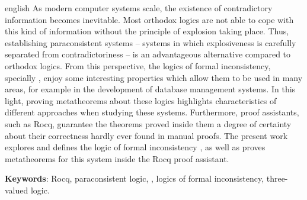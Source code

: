 \begin{resumo}[Abstract]
 \begin{otherlanguage*}{english}
    As modern computer systems scale, the existence of contradictory information becomes inevitable. Most orthodox logics are not able to cope with this kind of information without the principle of explosion taking place. Thus, establishing paraconsistent systems {--} systems in which explosiveness is carefully separated from contradictoriness {--} is an advantageous alternative compared to orthodox logics. From this perspective, the logics of formal inconsistency, specially \lfium{}, enjoy some interesting properties which allow them to be used in many areas, for example in the development of database management systems. In this light, proving metatheorems about these logics highlights characteristics of different approaches when studying these systems. Furthermore, proof assistants, such as Rocq, guarantee the theorems proved inside them a degree of certainty about their correctness hardly ever found in manual proofs. The present work explores and defines the logic of formal inconsistency \lfium{}, as well as proves metatheorems for this system inside the Rocq proof assistant.

   \textbf{Keywords}: Rocq, paraconsistent logic, \lfium{}, logics of formal inconsistency, three-valued logic.
 \end{otherlanguage*}
\end{resumo}

